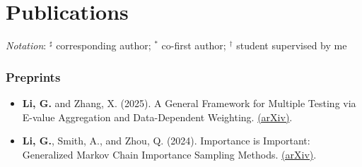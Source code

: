 \documentclass[letterpaper,11pt]{article}
\begin{document}
\section{Publications}
\textit{Notation}: $^\sharp$ corresponding author; $^*$ co-first author; $^\dagger$ student supervised by me

\subsubsection*{Preprints}
\begin{itemize}[leftmargin=0.15in, label={}]
    \item \textbf{Li, G.} and Zhang, X. (2025). A General Framework for Multiple Testing via E-value Aggregation and Data-Dependent Weighting. \href{https://arxiv.org/abs/2312.02905}{(arXiv)}.
    \item \textbf{Li, G.}, Smith, A., and Zhou, Q. (2024). Importance is Important: Generalized Markov Chain Importance Sampling Methods. \href{https://arxiv.org/abs/2304.06251}{(arXiv)}.
\end{itemize}
\end{document}
